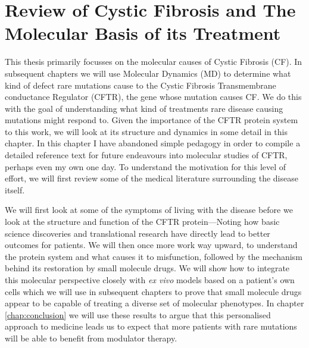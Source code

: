 \chapter{Review of Cystic Fibrosis and The Molecular Basis of its Treatment}
\label{chap:cftr}
\newpage





This thesis primarily focusses on the molecular causes of Cystic Fibrosis (CF). In subsequent chapters we will use Molecular Dynamics (MD) to determine what kind of defect rare mutations cause to the Cystic Fibrosis Transmembrane conductance Regulator (CFTR), the gene whose mutation causes CF. We do this with the goal of understanding what kind of treatments rare disease causing mutations might respond to. Given the importance of the CFTR protein system to this work, we will look at its structure and dynamics in some detail in this chapter. In this chapter I have abandoned simple pedagogy in order to compile a detailed reference text for future endeavours into molecular studies of CFTR, perhaps even my own one day. To understand the motivation for this level of effort, we will first review some of the medical literature surrounding the disease itself. 

We will first look at some of the symptoms of living with the disease before we look at the structure and function of the CFTR protein---Noting how basic science discoveries and translational research have directly lead to better outcomes for patients. We will then once more work way upward, to understand the protein system and what causes it to misfunction, followed by the mechanism behind its restoration by small molecule drugs. We will show how to integrate this molecular perspective closely with \textit {ex vivo} models based on a patient's own cells which we will use in subsequent chapters to prove that small molecule drugs appear to be capable of treating a diverse set of molecular phenotypes. In chapter \ref{chap:conclusion} we will use these results to argue that this personalised approach to medicine leads us to expect that more patients with rare mutations will be able to benefit from modulator therapy. 


